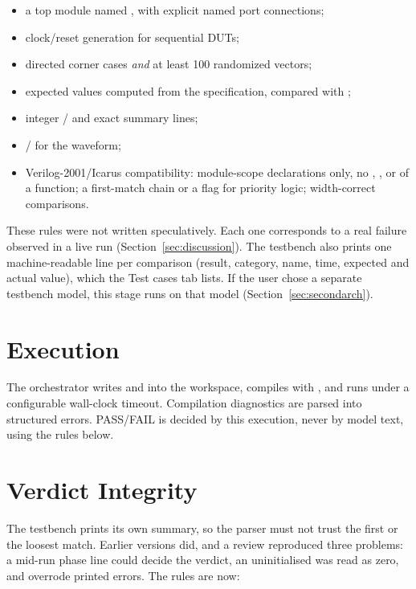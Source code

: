 \begin{itemize}
\item a top module named , with explicit named port connections;
\item clock/reset generation for sequential DUTs;
\item directed corner cases \emph{and} at least 100 randomized vectors;
\item expected values computed from the specification, compared with \code{===};
\item integer / and exact summary lines;
\item {}/ for the waveform;
\item Verilog-2001/Icarus compatibility: module-scope declarations only, no
, , or  of a function; a first-match
 chain or a  flag for priority logic; width-correct
comparisons.
\end{itemize}

These rules were not written speculatively. Each one corresponds to a real failure
observed in a live run (Section~\ref{sec:discussion}). The testbench also prints one
machine-readable  line per comparison (result, category, name, time,
expected and actual value), which the Test cases tab lists. If the user chose a
separate testbench model, this stage runs on that model (Section~\ref{sec:secondarch}).

\section{Execution}
The orchestrator writes  and  into the workspace,
compiles with , and runs
 under a configurable wall-clock timeout. Compilation diagnostics are
parsed into structured errors. PASS/FAIL is decided by this execution, never by
model text, using the rules below.

\section{Verdict Integrity}
\label{sec:verdict}
The testbench prints its own summary, so the parser must not trust the first or the
loosest match. Earlier versions did, and a review reproduced three problems: a
mid-run phase line could decide the verdict, an uninitialised  was
read as zero, and  overrode printed errors. The rules are now:

